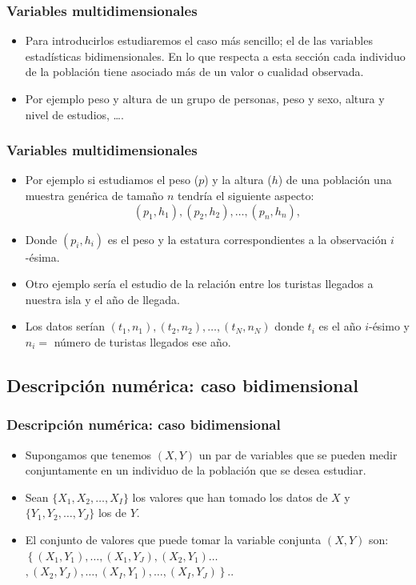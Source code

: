 \begin{frame}
\frametitle{Variables multidimensionales}
\begin{itemize}
\item  Para introducirlos estudiaremos el caso más sencillo;
el de las variables estadísticas bidimensionales. En lo que respecta a esta sección cada
individuo de la población tiene asociado más de un valor o cualidad observada.
\item   Por ejemplo peso y altura de un grupo de personas, peso y sexo, altura y nivel de estudios,
\ldots. 
\end{itemize}
\end{frame}

\begin{frame}
\frametitle{Variables multidimensionales}
\begin{itemize}
\item Por ejemplo  si estudiamos el peso ($p$) y la altura ($h$) de una población una
muestra genérica de tamaño $n$ tendría el siguiente aspecto:
$$
 (p_1,h_1),(p_2,h_2),\ldots,(p_n,h_n),
$$
\item Donde  $(p_i, h_i)$ es el peso y la estatura correspondientes a la observación $i$-ésima.
\item Otro ejemplo sería el estudio de la relación entre los turistas llegados a nuestra isla y
el año de llegada.
\item  Los datos serían $(t_1,n_1),(t_2,n_2),\ldots,(t_N,n_N)$
donde $t_i$ es el año $i$-ésimo y  $n_i=$ número de turistas llegados ese año.
\end{itemize}
\end{frame}

\subsection{Descripción numérica: caso bidimensional}
\begin{frame}
\frametitle{Descripción numérica: caso bidimensional}
\begin{itemize}
\item Supongamos que tenemos $(X,Y)$  un par de variables que se pueden medir conjuntamente en
un individuo de la población que se desea estudiar.
\item Sean $\{X_1,X_2,\ldots, X_I\}$ los valores que han tomado los datos  de  $X$ y   $\{Y_1,Y_2,\ldots, Y_J\}$
los de $Y$.
\item El conjunto de valores que puede tomar la variable conjunta $(X,Y)$ son:
$
\left\{(X_1,Y_1),\ldots,(X_1,Y_J),(X_2,Y_1)\ldots\right.
$
$
\left.,(X_2,Y_J),\ldots,(X_I,Y_1),\ldots
,(X_I,Y_J)\right\}.
$.
\end{itemize}
\end{frame}

